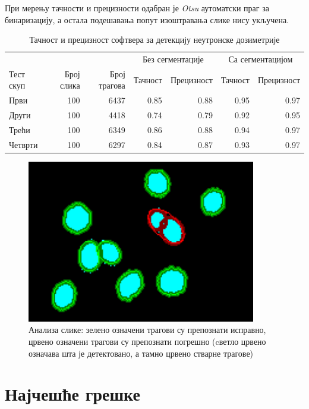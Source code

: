 \documentclass[11pt,a4paper,serbian,oneside]{book}
\begin{document}
При мерењу тачности и прецизности одабран је \textit{Otsu} аутоматски праг за бинаризацију, а остала подешавања попут изоштравања слике нису укључена.

\begin{table}[H]
\centering%
\caption{Тачност и прецизност софтвера за детекцију неутронске дозиметрије}
\begin{tabular}{lrrrrrr}
\hline
& & & \multicolumn{2}{c}{Без сегментације} & \multicolumn{2}{c}{Са сегментацијом} \\
Тест скуп & Број слика & Број трагова & Тачност & Прецизност & Тачност &  Прецизност \\
\hline
Први & 100 & 6437 & 0.85 & 0.88 & 0.95 & 0.97 \\
Други & 100 & 4418 & 0.74 & 0.79 & 0.92 & 0.95 \\
Трећи & 100 & 6349 & 0.86 & 0.88 & 0.94 & 0.97 \\
Четврти & 100 & 6297 & 0.84 & 0.87 & 0.93 & 0.97 \\
\hline
\end{tabular}
\label{tab:metrics}
\end{table} 

\begin{figure}[H]
\begin{center}
\includegraphics[width=100mm]{images/analysis.png}
\end{center}
\caption{Анализа слике: зелено означени трагови су препознати исправно, црвено означени трагови су препознати погрешно (cветло црвено означава шта је детектовано, а тамно црвено стварне трагове) }
\label{fig:analysis}
\end{figure}

\section{Најчешће грешке}
\end{document}
